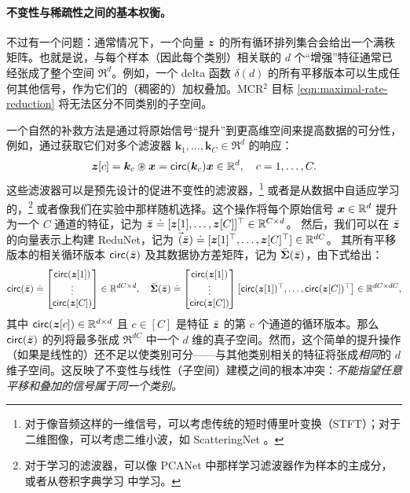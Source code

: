 \documentclass[../../book-main_zh.tex]{subfiles}
\begin{document}
\paragraph{不变性与稀疏性之间的基本权衡。}
不过有一个问题：通常情况下，一个向量 $\bm{z}$ 的所有循环排列集合会给出一个满秩矩阵。也就是说，与每个样本（因此每个类别）相关联的 $d$ 个“增强”特征通常已经张成了整个空间 $\Re^d$。例如，一个 delta 函数 $\delta(d)$ 的所有平移版本可以生成任何其他信号，作为它们的（稠密的）加权叠加。MCR$^2$ 目标 \eqref{eqn:maximal-rate-reduction} 将无法区分不同类别的子空间。

一个自然的补救方法是通过将原始信号“提升”到更高维空间来提高数据的可分性，例如，通过获取它们对多个滤波器 $\bm k_1, \ldots, \bm k_C \in \Re^d$ 的响应：
\begin{equation}
\bm z[c] = \bm k_c \circledast \bm x  =  \mathsf{circ}(\bm k_c) \bm x \in \mathbb{R}^d, \quad c = 1, \ldots, C.
\label{eqn:lift-1d}
\end{equation}
这些滤波器可以是预先设计的促进不变性的滤波器，\footnote{对于像音频这样的一维信号，可以考虑传统的短时傅里叶变换（STFT）；对于二维图像，可以考虑二维小波，如 ScatteringNet \cite{scattering-net}。} 或者是从数据中自适应学习的，\footnote{对于学习的滤波器，可以像 PCANet \cite{chan2015pcanet} 中那样学习滤波器作为样本的主成分，或者从卷积字典学习 \cite{li2019multichannel,qu2019nonconvex} 中学习。} 或者像我们在实验中那样随机选择。这个操作将每个原始信号 $\bm{x} \in \mathbb{R}^d$ 提升为一个 $C$ 通道的特征，记为 $\bar{\bm{z}}  \doteq [\bm{z}[1], \ldots, \bm{z}[C]]^\top \in \mathbb{R}^{C\times d}$。
然后，我们可以在 $\bar{\bm{z}}$ 的向量表示上构建 ReduNet，记为
$\vec(\bar{\bm{z}}) \doteq [\bm{z}[1]^\top, \ldots, \bm{z}[C]^\top] \in \mathbb{R}^{dC}$。
其所有平移版本的相关循环版本 $ \mathsf{circ}(\bar{\bm{z}})$ 及其数据协方差矩阵，记为 $\bar{\bm \Sigma}(\bar{\bm{z}})$，由下式给出：
\begin{equation}
\begin{aligned}
 \mathsf{circ}(\bar{\bm{z}}) \doteq \left[\begin{matrix}
    \mathsf{circ}(\bm{z}[1])  \\ \vdots \\ \mathsf{circ}(\bm{z}[C]) \end{matrix} \right] \in \mathbb{R}^{dC\times d},
    \quad  \bar{\bm \Sigma}(\bar{\bm{z}}) \doteq
    \left[\begin{matrix}
    \mathsf{circ}(\bm{z}[1]) \\ \vdots \\ \mathsf{circ}(\bm{z}[C]) \end{matrix} \right]
    \left[\begin{matrix}\mathsf{circ}(\bm{z}[1])^\top,\ldots, \mathsf{circ}(\bm{z}[C])^\top\end{matrix} \right] \in \mathbb{R}^{dC\times dC},
    \label{eqn:W-multichannel}
\end{aligned}
\end{equation}
其中 $\mathsf{circ}(\bm{z}[c]) \in \mathbb{R}^{d\times d}$ 且 $c \in [C]$ 是特征 $\bar {\bm{z}}$ 的第 $c$ 个通道的循环版本。那么 $\mathsf{circ}(\bar{\bm{z}})$ 的列将最多张成 $\Re^{dC}$ 中一个 $d$ 维的真子空间。然而，这个简单的提升操作（如果是线性的）还不足以使类别可分——与其他类别相关的特征将张成{\em 相同}的 $d$ 维子空间。这反映了不变性与线性（子空间）建模之间的根本冲突：{\em 不能指望任意平移和叠加的信号属于同一个类别。}
\end{document}
